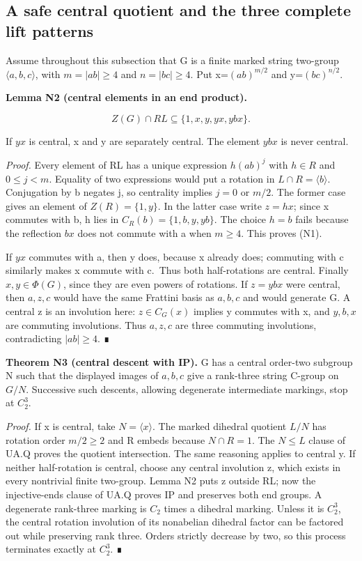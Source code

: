 \subsection{A safe central quotient and the three complete lift patterns}\label{a-safe-central-quotient-and-the-three-complete-lift-patterns}

Assume throughout this subsection that G is a finite marked string two-group \(\langle a,b,c\rangle\), with \(m=|ab|\ge 4\) and \(n=|bc|\ge 4\). Put x=\((ab)^{m/2}\) and y=\((bc)^{n/2}\).

\textbf{Lemma N2 (central elements in an end product).}

\[
Z(G)\cap RL\subseteq\{1,x,y,yx,ybx\}.
\tag{N1}
\]

If \(yx\) is central, x and y are separately central. The element \(ybx\) is never central.

\emph{Proof.} Every element of RL has a unique expression \(h(ab)^{j}\) with \(h\in R\) and \(0\le j<m\). Equality of two expressions would put a rotation in \(L\cap R=\langle b\rangle\). Conjugation by b negates j, so centrality implies \(j=0\) or \(m/2\). The former case gives an element of \(Z(R)=\{1,y\}\). In the latter case write \(z=hx\); since x commutes with b, h lies in \(C_R(b)=\{1,b,y,yb\}\). The choice \(h=b\) fails because the reflection \(bx\) does not commute with a when \(m\ge 4\). This proves (N1).

If \(yx\) commutes with a, then y does, because x already does; commuting with c similarly makes x commute with c.~Thus both half-rotations are central. Finally \(x,y\in \Phi(G)\), since they are even powers of rotations. If \(z=ybx\) were central, then \(a,z,c\) would have the same Frattini basis as \(a,b,c\) and would generate G. A central z is an involution here: \(z\in C_G(x)\) implies y commutes with x, and \(y,b,x\) are commuting involutions. Thus \(a,z,c\) are three commuting involutions, contradicting \(|ab|\ge 4\). ∎

\textbf{Theorem N3 (central descent with IP).} G has a central order-two subgroup N such that the displayed images of \(a,b,c\) give a rank-three string C-group on \(G/N\). Successive such descents, allowing degenerate intermediate markings, stop at \(C_{2}^{3}\).

\emph{Proof.} If x is central, take \(N=\langle x\rangle\). The marked dihedral quotient \(L/N\) has rotation order \(m/2\ge 2\) and R embeds because \(N\cap R=1\). The \(N\le L\) clause of UA.Q proves the quotient intersection. The same reasoning applies to central y. If neither half-rotation is central, choose any central involution z, which exists in every nontrivial finite two-group. Lemma N2 puts z outside RL; now the injective-ends clause of UA.Q proves IP and preserves both end groups. A degenerate rank-three marking is \(C_{2}\) times a dihedral marking. Unless it is \(C_{2}^{3}\), the central rotation involution of its nonabelian dihedral factor can be factored out while preserving rank three. Orders strictly decrease by two, so this process terminates exactly at \(C_{2}^{3}\). ∎

